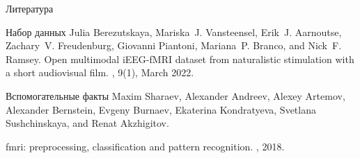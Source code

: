 \documentclass[9pt,pdf]{beamer} %
\begin{document}
\begin{frame}{Литература}
    \begin{block}{Набор данных}
    Julia Berezutskaya, Mariska~J. Vansteensel, Erik~J. Aarnoutse, Zachary~V. Freudenburg, Giovanni Piantoni, Mariana~P. Branco, and Nick~F. Ramsey.
    \newblock Open multimodal {iEEG}-{fMRI} dataset from naturalistic stimulation with a short audiovisual film.
    , 9(1), March 2022.
    \end{block}

    \begin{block}{Вспомогательные факты}
        Maxim Sharaev, Alexander Andreev, Alexey Artemov, Alexander Bernstein, Evgeny Burnaev, Ekaterina Kondratyeva, Svetlana Sushchinskaya, and Renat Akzhigitov.
        
        \newblock fmri: preprocessing, classification and pattern recognition.
        , 2018.
    \end{block}
\end{frame}
\end{document}
